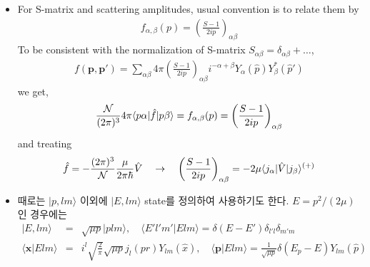 \documentclass[10pt]{book}
\def\bm{\boldsymbol}
\newcommand{\bea}{\begin{eqnarray}}
\newcommand{\eea}{\end{eqnarray}}
\newcommand{\no}{\nonumber \\}
\def\vp{{\bm p}}
\def\vx{{\bm x}}
\def\la{\langle}
\def\ra{\rangle}
\begin{document}
\begin{itemize}
      \item For S-matrix and scattering amplitudes, usual convention is to relate them by
      \bea 
      f_{\alpha,\beta}(p)=\left(\frac{S-1}{2ip}\right)_{\alpha\beta}
      \eea 
      To be consistent with the normalization of S-matrix $S_{\alpha\beta}=\delta_{\alpha\beta}+\dots$,
      \bea 
      f(\vp, \vp')=\sum_{\alpha\beta} 4\pi
       \left(\frac{S-1}{2ip}\right)_{\alpha\beta}
      i^{-\alpha+\beta}
      Y_{\alpha}(\hat{p})Y_{\beta}^*(\hat{p}')
      \eea 
      we get,
      \bea 
      \frac{\cal N}{(2\pi)^3} 4\pi \la p \alpha |\hat{f}|p \beta \ra 
      =f_{\alpha,\beta}(p)=\left(\frac{S-1}{2ip}\right)_{\alpha\beta}
      \eea 
      and treating
      \bea 
      \hat{f}=-\frac{(2\pi)^3}{\cal N}\frac{\mu}{2\pi\hbar}\hat{V}
      \quad\to\quad 
      \left(\frac{S-1}{2ip}\right)_{\alpha\beta}= -2\mu \la j_\alpha|\hat{V}|j_\beta\ra^{(+)} 
      \eea 
      
      \item 때로는 $|p,lm\ra$ 이외에 $|E,lm\ra$ state를 정의하여 사용하기도 한다.
      $E=p^2/(2\mu)$ 인 경우에는
      \bea
      |E,lm\ra&=&\sqrt{\mu p}|p lm\ra,\quad  
      \la E' l' m'|E l m\ra=\delta(E-E')\delta_{l'l}\delta_{m'm}\no
      \la \vx| E lm\ra&=& i^l\sqrt{\frac{2}{\pi}}\sqrt{\mu p} j_l(pr)Y_{lm}(\hat{x}),\quad
      \la \vp| E lm\ra=
      \frac{1}{\sqrt{\mu p}}\delta(E_p-E) Y_{lm}(\hat{p})
      \eea
\end{itemize}
\end{document}
